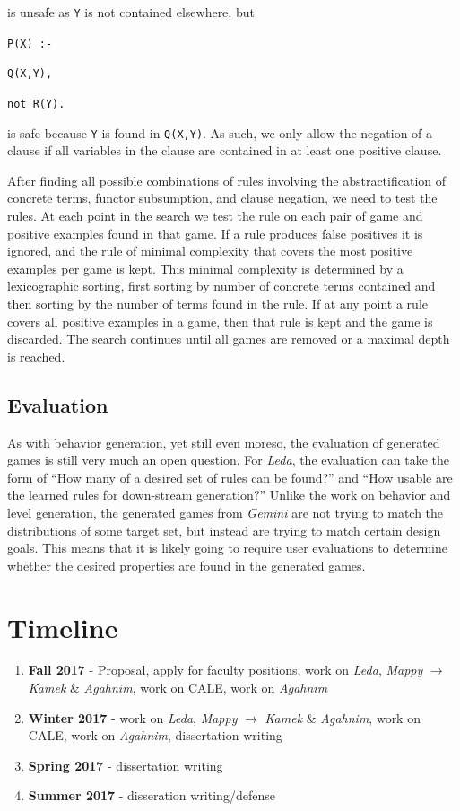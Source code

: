 \documentclass[12pt]{report}
\begin{document}
\noindent is unsafe as \texttt{Y} is not contained elsewhere, but

\noindent \texttt{P(X) :- }

\texttt{Q(X,Y),}

\texttt{not R(Y).}

\noindent is safe because \texttt{Y} is found in \texttt{Q(X,Y)}.  As such, we only allow the negation of a clause if all variables in the clause are contained in at least one positive clause.

After finding all possible combinations of rules involving the abstractification of concrete terms, functor subsumption, and clause negation, we need to test the rules.  At each point in the search we test the rule on each pair of game and positive examples found in that game. If a rule produces false positives it is ignored, and the rule of minimal complexity that covers the most positive examples per game is kept.  This minimal complexity is determined by a lexicographic sorting, first sorting by number of concrete terms contained and then sorting by the number of terms found in the rule. If at any point a rule covers all positive examples in a game, then that rule is kept and the game is discarded.  The search continues until all games are removed or a maximal depth is reached.    

\section*{Evaluation}

As with behavior generation, yet still even moreso, the evaluation of generated games is still very much an open question.  For \textit{Leda}, the evaluation can take the form of ``How many of a desired set of rules can be found?'' and ``How usable are the learned rules for down-stream generation?''  Unlike the work on behavior and level generation, the generated games from \textit{Gemini} are not trying to match the distributions of some target set, but instead are trying to match certain design goals.  This means that it is likely going to require user evaluations to determine whether the desired properties are found in the generated games.

\chapter*{Timeline}

\begin{enumerate}
\item \textbf{Fall 2017} - Proposal, apply for faculty positions, work on \textit{Leda}, \textit{Mappy} $\rightarrow$ \textit{Kamek} \& \textit{Agahnim}, work on CALE, work on \textit{Agahnim}
\item \textbf{Winter 2017} - work on \textit{Leda}, \textit{Mappy} $\rightarrow$ \textit{Kamek} \& \textit{Agahnim}, work on CALE, work on \textit{Agahnim}, dissertation writing
\item \textbf{Spring 2017} - dissertation writing
\item \textbf{Summer 2017} - disseration writing/defense

\end{enumerate}



\end{document}
